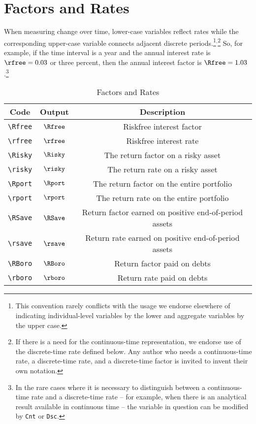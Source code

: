 \documentclass[12pt]{\econtex}
\begin{document}
\section{Factors and Rates}
When measuring change over time, lower-case variables reflect rates
while the corresponding upper-case variable connects adjacent discrete periods.\footnote{This
  convention rarely conflicts with the usage we endorse elsewhere of
  indicating individual-level variables by the lower and aggregate
  variables by the upper case.}$^{,}$\footnote{If there is a need for the continuous-time 
  representation, we endorse use of the discrete-time rate defined below.  Any
  author who needs a continuous-time rate, a discrete-time rate, and a discrete-time factor
  is invited to invent their own notation.}  So, for example, if the time interval is a year and the annual interest rate is $\rfree=0.03$ or three percent, then 
the annual interest factor is $\Rfree=1.03$.\footnote{In the rare cases where it is necessary to distinguish between a continuous-time rate and a discrete-time rate -- for example, when there is an analytical result available in continuous time -- the variable in question can be modified by \texttt{Cnt} or \texttt{Dsc}.}


\begin{table}[ht]
  \centering
  \begin{tabular}{|ccc|} 		
    \hline
    Code    & Output & Description 
    \\ \hline 
    \verb|\Rfree| & $\Rfree$     & Riskfree interest factor
    \\ \verb|\rfree| & $\rfree$     & Riskfree interest rate
    \\ \verb|\Risky| & $\Risky$     & The return factor on a risky asset
    \\ \verb|\risky| & $\risky$     & The return rate on a risky asset
    \\ \verb|\Rport| & $\Rport$     & The return factor on the entire portfolio
    \\ \verb|\rport| & $\rport$     & The return rate on the entire portfolio
    \\ \verb|\RSave| & $\RSave$     & Return factor earned on positive end-of-period assets
    \\ \verb|\rsave| & $\rsave$     & Return rate earned on positive end-of-period assets
    \\ \verb|\RBoro| & $\RBoro$     & Return factor paid on debts
    \\ \verb|\rboro| & $\rboro$     & Return rate paid on debts 
    \\	\hline
  \end{tabular}
  \caption{Factors and Rates}
  \label{table:Factors}
\end{table}	
\end{document}
